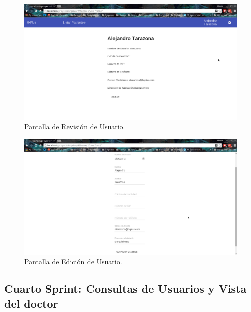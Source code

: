 \begin{enumerate}
\begin{itemize}
            \begin{figure}[htbp!]
                \begin{center}
                    \includegraphics[width=.8\textwidth]{figures/p3}
                \end{center}
                \caption{Pantalla de Revisión de Usuario.}
                \label{Revisión}
            \end{figure}
            
            \begin{figure}[htbp!]
                \begin{center}
                    \includegraphics[width=.8\textwidth]{figures/p5}
                \end{center}
                \caption{Pantalla de Edición de Usuario.}
                \label{Edición}
            \end{figure}
            
        \end{itemize}
         

         
            
    \end{enumerate}
             
        
    \subsection{Cuarto Sprint: Consultas de Usuarios y Vista del doctor}
    
